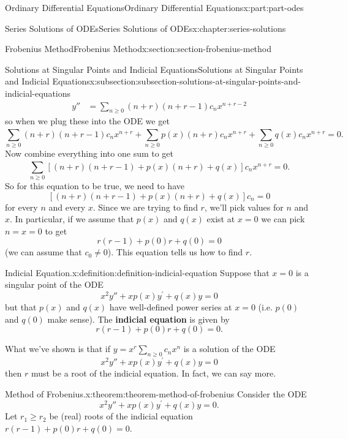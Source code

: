 \documentclass[oneside,10pt,]{book}
\newcommand{\terminology}[1]{\textbf{#1}}
\numberwithin{equation}{part}
\newcommand{\amp}{&}
\begin{document}
\begin{partptx}{Ordinary Differential Equations}{}{Ordinary Differential Equations}{}{}{x:part:part-odes}
\begin{chapterptx}{Series Solutions of ODEs}{}{Series Solutions of ODEs}{}{}{x:chapter:series-solutions}
\begin{sectionptx}{Frobenius Method}{}{Frobenius Method}{}{}{x:section:section-frobenius-method}
\begin{subsectionptx}{Solutions at Singular Points and Indicial Equations}{}{Solutions at Singular Points and Indicial Equations}{}{}{x:subsection:subsection-solutions-at-singular-points-and-indicial-equations}
\begin{align*}
y'' \amp= \sum_{n\geq0}^{}(n+r)(n+r-1)c_{n}x^{n+r-2}
\end{align*}
so when we plug these into the ODE we get%
\begin{equation*}
\sum_{n\geq0}^{}(n+r)(n+r-1)c_{n}x^{n+r}+\sum_{n\geq0}^{}p(x)(n+r)c_{n}x^{n+r}+\sum_{n\geq0}^{}q(x)c_{n}x^{n+r} = 0.
\end{equation*}
Now combine everything into one sum to get%
\begin{equation*}
\sum_{n\geq0}^{}\left[(n+r)(n+r-1)+p(x)(n+r)+q(x)\right]c_{n}x^{n+r} = 0.
\end{equation*}
So for this equation to be true, we need to have%
\begin{equation*}
\left[(n+r)(n+r-1)+p(x)(n+r)+q(x)\right]c_{n} = 0
\end{equation*}
for every \(n\) and every \(x\). Since we are trying to find \(r\), we'll pick values for \(n\) and \(x\). In particular, if we assume that \(p(x)\) and \(q(x)\) exist at \(x=0\) we can pick \(n=x=0\) to get%
\begin{equation*}
r(r-1)+p(0)r+q(0) = 0
\end{equation*}
(we can assume that \(c_{0}\neq0\)). This equation tells us how to find \(r\).%
\begin{definition}{Indicial Equation.}{x:definition:definition-indicial-equation}%
%
Suppose that \(x=0\) is a singular point of the ODE%
\begin{equation*}
x^{2}y''+xp(x)y^\prime+q(x)y=0
\end{equation*}
but that \(p(x)\) and \(q(x)\) have well-defined power series at \(x=0\) (i.e. \(p(0)\) and \(q(0)\) make sense). The \terminology{indicial equation} is given by%
\begin{equation*}
r(r-1)+p(0)r+q(0) = 0.
\end{equation*}
%
\end{definition}
What we've shown is that if \(y=x^{r}\sum_{n\geq0}^{}c_{n}x^{n}\) is a solution of the ODE%
\begin{equation*}
x^{2}y''+xp(x)y^\prime+q(x)y=0
\end{equation*}
then \(r\) must be a root of the indicial equation. In fact, we can say more.%
\begin{theorem}{Method of Frobenius.}{}{x:theorem:theorem-method-of-frobenius}%
%
Consider the ODE%
\begin{equation*}
x^{2}y''+xp(x)y^\prime+q(x)y=0.
\end{equation*}
Let \(r_{1}\geq r_{2}\) be (real) roots of the indicial equation \(r(r-1)+p(0)r+q(0)=0\).%

\end{theorem}
\end{subsectionptx}
\end{sectionptx}
\end{chapterptx}
\end{partptx}
\end{document}
